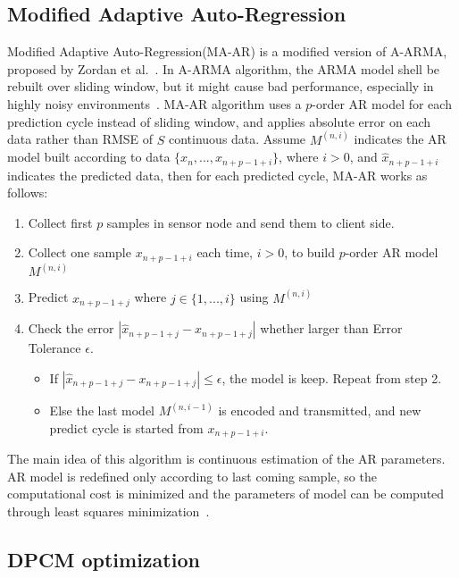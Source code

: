 \subsection{Modified Adaptive Auto-Regression}
Modified Adaptive Auto-Regression(MA-AR) is a modified version of A-ARMA,
proposed by Zordan et al.~\cite{zordan2012compress}. In A-ARMA algorithm, the
ARMA model shell be rebuilt over sliding window, but it might cause bad
performance, especially in highly noisy environments~\cite{zordan2012compress}.
MA-AR algorithm uses a $p$-order AR model for each prediction cycle instead of
sliding window, and applies absolute error on each data rather than RMSE of $S$
continuous data. Assume $M^{(n, i)}$ indicates the AR model built according to
data $\{x_n, ..., x_{n+p-1+i} \}$, where $i>0$, and $\hat{x}_{n+p-1+i}$
indicates the predicted data, then for each predicted cycle, MA-AR works as
follows:

\begin{enumerate}
    \item Collect first $p$ samples in sensor node and send them to client side.
    \item Collect one sample $x_{n+p-1+i}$ each time, $i > 0$, to build
    $p$-order
    AR model $M^{(n, i)}$
    \item Predict $x_{n+p-1+j}$ where $j \in \{1, ..., i\}$ using $M^{(n, i)}$
    \item Check the error $ |\hat{x}_{n+p-1+j} - x_{n+p-1+j}|$ whether larger
    than Error Tolerance $\epsilon$.
        \begin{itemize}
            \item If $|\hat{x}_{n+p-1+j} - x_{n+p-1+j}| \leqslant \epsilon$, the
            model is keep. Repeat from step 2.
            \item Else the last model $M^{(n, i-1)}$ is encoded and transmitted,
            and new predict cycle is started from $x_{n+p-1+i}$.
        \end{itemize} 
\end{enumerate}
The main idea of this algorithm is continuous estimation of the AR parameters.
AR model is redefined only according to last coming sample, so the computational
cost is minimized and the parameters of model can be computed through least
squares minimization~\cite{zordan2012compress}. 


\subsection{DPCM optimization}
